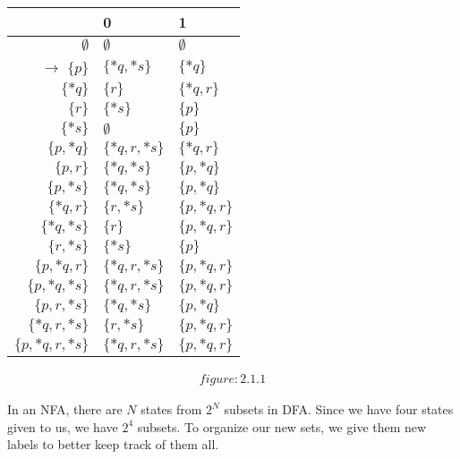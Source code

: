 \documentclass{article}
\theoremstyle{theorem}
\theoremstyle{definition}
\theoremstyle{remark}
\begin{document}
\begin{table}[h!] %
\centering
\begin{tabular}{r||l|l}
    & 0 & 1 \\
    \hline
    $\emptyset$ & $\emptyset$ & $\emptyset$ \\
    $\rightarrow$ $\{p\}$ & $\{*q, *s\}$ & $\{*q\}$ \\
    $\{*q\}$ & $\{r\}$ & $\{*q, r\}$ \\
    $\{r\}$ & $\{*s\}$ & $\{p\}$ \\
    $\{*s\}$ & $\emptyset$ & $\{p\}$ \\

    $\{p, *q\}$ & $\{*q, r, *s\}$ & $\{*q, r\}$ \\
    $\{p, r\}$ & $\{*q, *s\}$ & $\{p, *q\}$ \\
    $\{p, *s\}$ & $\{*q, *s\}$ & $\{p, *q\}$ \\

    $\{*q, r\}$ & $\{r, *s\}$ & $\{p, *q, r\}$ \\
    $\{*q, *s\}$ & $\{r\}$ & $\{p, *q, r\}$ \\

    $\{r, *s\}$ & $\{*s\}$ & $\{p\}$ \\

    $\{p, *q, r\}$ & $\{*q, r, *s\}$ & $\{p, *q, r\}$ \\
    $\{p, *q, *s\}$ & $\{*q, r, *s\}$ & $\{p, *q, r\}$ \\
    $\{p, r, *s\}$ & $\{*q, *s\}$ & $\{p, *q\}$ \\
    $\{*q, r, *s\}$ & $\{r, *s\}$ & $\{p, *q, r\}$ \\

    $\{p, *q, r, *s\}$ & $\{*q, r, *s\}$ & $\{p, *q, r\}$ \\
\end{tabular}
\begin{align*}
figure:2.1.1
\end{align*}
\end{table}

In an NFA, there are $N$ states from $2^N$ subsets in DFA. Since we have four states given to us, we have $2^4$ subsets. To organize our new sets, we give them new labels to better keep track of them all.
\end{document}
